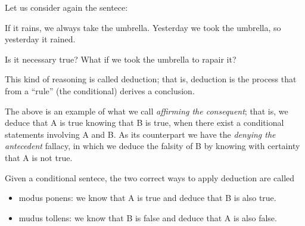 \documentclass{subfiles}
\begin{document}
    Let us consider again the sentece: 
    \begin{quote*}
        If it rains, we always take the umbrella. Yesterday we took the umbrella,
        so yesterday it rained.
    \end{quote*}
    Is it necessary true? What if we took the umbrella to rapair it?

    This kind of reasoning is called deduction; that is, 
        deduction is the process that from a ``rule'' (the conditional) derives a conclusion.

    The above is an example of what we call \emph{affirming the consequent}; 
        that is, we deduce that A is true knowing that B is true, 
        when there exist a conditional statements involving A and B.
        As its counterpart we have the \emph{denying the antecedent} fallacy,
        in which we deduce the falsity of B by knowing with certainty that A is not true.

    Given a conditional sentece, the two correct ways to apply deduction are called 
    \begin{itemize}
        \item \foreignlanguage{latin}{modus ponens}: we know that A is true and deduce that B is also true. 
        \item \foreignlanguage{latin}{mudus tollens}: we know that B is false and deduce that A is also false.
    \end{itemize}
\end{document}
